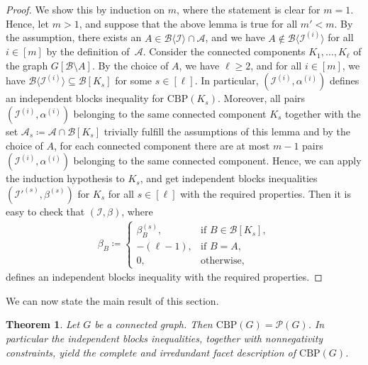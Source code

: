 \documentclass[12pt]{amsart}
\newtheorem{theorem}{Theorem}[section]
\newcommand{\CBP}{\mathrm{CBP}}
\renewcommand{\P}{\mathcal{P}}
\newcommand{\I}{\mathcal{I}}
\newcommand{\B}{\mathcal{B}}
\newcommand{\A}{\mathcal{A}}
\begin{document}
\begin{proof}
    We show this by induction on $m$, where the statement is clear for $m=1$. Hence, let $m > 1$, and suppose that the above lemma is true for all $m' < m$. By the assumption, there exists an $A \in \B\langle \I \rangle \cap \A $, and we have $ A \notin \B\langle \I^{(i)} \rangle$ for all $i \in [m]$ by the definition of~$\A$. Consider the connected components $K_1,\ldots,K_\ell$ of the graph $G[\B \setminus A]$. By the choice of $A$, we have $\ell \ge 2$, and for all $i \in [m]$, we have $\B\langle \I^{(i)} \rangle \subseteq \B[K_s]$ for some $s \in [\ell]$. In particular, $(\I^{(i)},\alpha^{(i)})$ defines an independent blocks inequality for $\CBP(K_s)$. Moreover, all pairs $(\I^{(i)},\alpha^{(i)})$ belonging to the same connected component $K_s$ together with the set $\A_s \coloneqq \A \cap \B[K_s]$ trivially fulfill the assumptions of this lemma and by the choice of $A$, for each connected component there are at most $m-1$ pairs $(\I^{(i)},\alpha^{(i)})$ belonging to the same connected component. Hence, we can apply the induction hypothesis to $K_s$, and get independent blocks inequalities $(\I'^{(s)},\beta^{(s)})$ for $K_s$ for all $s \in [\ell]$ with the required properties. Then it is easy to check that $(\I,\beta)$, where
    \begin{align*}
    	\beta_B \coloneqq \begin{cases} \beta^{(s)}_B, &\text{if } B \in \B[ K_s], \\
    		-(\ell-1), &\text{if } B=A, \\
    		0, &\text{otherwise},
    	\end{cases}
    \end{align*}
defines an independent blocks inequality with the required properties.
\end{proof}

We can now state the main result of this section.

\begin{theorem}
    \label{completefacets}
    Let $G$ be a connected graph. Then $\CBP(G) = \P(G)$. In particular the independent blocks inequalities, together with nonnegativity constraints, yield the complete and irredundant facet description of $\CBP(G)$.
\end{theorem}
\end{document}
